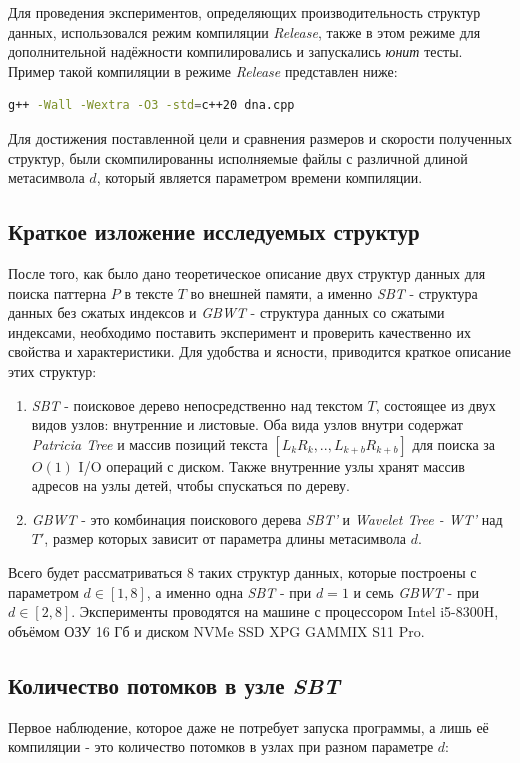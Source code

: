 \documentclass[a4paper,12pt]{article}
\begin{document}
Для проведения экспериментов, определяющих производительность структур данных, использовался режим компиляции \textit{Release}, также в этом режиме для дополнительной надёжности компилировались и запускались \textit{юнит} тесты. Пример такой компиляции в режиме \textit{Release} представлен ниже:
\begin{lstlisting}[language=bash]
g++ -Wall -Wextra -O3 -std=c++20 dna.cpp
\end{lstlisting}

Для достижения поставленной цели и сравнения размеров и скорости полученных структур, были скомпилированны исполняемые файлы с различной длиной метасимвола $d$, который является параметром времени компиляции.

\subsection{Краткое изложение исследуемых структур}

После того, как было дано теоретическое описание двух структур данных для поиска паттерна $P$ в тексте $T$ во внешней памяти, а именно \textit{SBT} - структура данных без сжатых индексов и \textit{GBWT} - структура данных со сжатыми индексами, необходимо поставить эксперимент и проверить качественно их свойства и характеристики. Для удобства и ясности, приводится краткое описание этих структур:
\begin{enumerate}
    \item \textit{SBT} - поисковое дерево непосредственно над текстом $T$, состоящее из двух видов узлов: внутренние и листовые. Оба вида узлов внутри содержат \textit{Patricia Tree} и массив позиций текста $[L_k R_k,..,L_{k+b}R_{k+b}]$ для поиска за $O(1)$ I/O операций с диском. Также внутренние узлы хранят массив адресов на узлы детей, чтобы спускаться по дереву.
    \item \textit{GBWT} - это комбинация поискового дерева \textit{SBT'} и \textit{Wavelet Tree - WT'} над $T'$, размер которых зависит от параметра длины метасимвола $d$.
\end{enumerate}

Всего будет рассматриваться $8$ таких структур данных, которые построены с параметром $d \in [1,8]$, а именно одна \textit{SBT} - при $d = 1$ и семь \textit{GBWT} - при $d \in [2, 8]$.
Эксперименты проводятся на машине с процессором Intel i5-8300H, объёмом ОЗУ 16 Гб и диском NVMe SSD XPG GAMMIX S11 Pro. 

\subsection{Количество потомков в узле \textit{SBT}}
Первое наблюдение, которое даже не потребует запуска программы, а лишь её компиляции - это количество потомков в узлах при разном параметре $d$:
\end{document}
